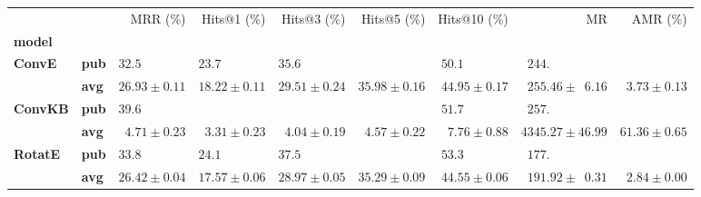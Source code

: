 \begin{tabular}{llrrrrrrr}
\toprule
       &     &                    MRR (\%) &                 Hits@1 (\%) &                 Hits@3 (\%) &                 Hits@5 (\%) &                Hits@10 (\%) &                                       MR &                    AMR (\%) \\
\textbf{model} & {} &                             &                             &                             &                             &                             &                                          &                             \\
\midrule
\textbf{ConvE} & \textbf{pub} &  $32.5\phantom{0 \pm 0.00}$ &  $23.7\phantom{0 \pm 0.00}$ &  $35.6\phantom{0 \pm 0.00}$ &                             &  $50.1\phantom{0 \pm 0.00}$ &  $\phantom{0}244.\phantom{00 \pm 00.00}$ &                             \\
       & \textbf{avg} &            $26.93 \pm 0.11$ &            $18.22 \pm 0.11$ &            $29.51 \pm 0.24$ &            $35.98 \pm 0.16$ &            $44.95 \pm 0.17$ &  $\phantom{0}255.46 \pm \phantom{0}6.16$ &  $\phantom{0}3.73 \pm 0.13$ \\
\textbf{ConvKB} & \textbf{pub} &  $39.6\phantom{0 \pm 0.00}$ &                             &                             &                             &  $51.7\phantom{0 \pm 0.00}$ &  $\phantom{0}257.\phantom{00 \pm 00.00}$ &                             \\
       & \textbf{avg} &  $\phantom{0}4.71 \pm 0.23$ &  $\phantom{0}3.31 \pm 0.23$ &  $\phantom{0}4.04 \pm 0.19$ &  $\phantom{0}4.57 \pm 0.22$ &  $\phantom{0}7.76 \pm 0.88$ &                      $4345.27 \pm 46.99$ &            $61.36 \pm 0.65$ \\
\textbf{RotatE} & \textbf{pub} &  $33.8\phantom{0 \pm 0.00}$ &  $24.1\phantom{0 \pm 0.00}$ &  $37.5\phantom{0 \pm 0.00}$ &                             &  $53.3\phantom{0 \pm 0.00}$ &  $\phantom{0}177.\phantom{00 \pm 00.00}$ &                             \\
       & \textbf{avg} &            $26.42 \pm 0.04$ &            $17.57 \pm 0.06$ &            $28.97 \pm 0.05$ &            $35.29 \pm 0.09$ &            $44.55 \pm 0.06$ &  $\phantom{0}191.92 \pm \phantom{0}0.31$ &  $\phantom{0}2.84 \pm 0.00$ \\
\bottomrule
\end{tabular}

